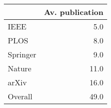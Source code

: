 \begin{tabular}{lr}
\toprule
{} &  Av. publication \\
\midrule
IEEE     &              5.0 \\
PLOS     &              8.0 \\
Springer &              9.0 \\
Nature   &             11.0 \\
arXiv    &             16.0 \\
Overall  &             49.0 \\
\bottomrule
\end{tabular}
